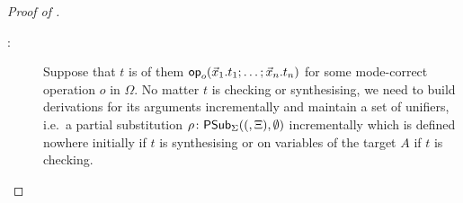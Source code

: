 \begin{proof}[Proof of {}]
\begin{description}
    \item[:]
      Suppose that $t$ is of them $\mathsf{op}_o(\vec{x}_1.t_1; \ldots; \vec{x}_n.t_n)$ for some mode-correct operation $o$ in $\Omega$.
      No matter $t$ is checking or synthesising, we need to build derivations for its arguments incrementally and maintain a set of unifiers, i.e.\ a partial substitution $\rho\colon \mathsf{PSub}_{\Sigma}((,\Xi), \emptyset)$ incrementally which is defined nowhere initially if $t$ is synthesising or on variables of the target $A$ if $t$ is checking. 

  \end{description}
\end{proof}
